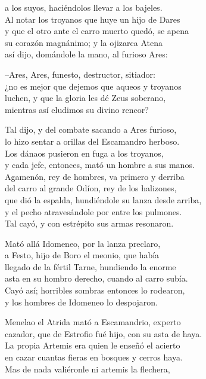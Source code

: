 a los suyos, haciéndolos llevar a los bajeles.\\
Al notar los troyanos que huye un hijo de Dares\\
y que el otro ante el carro muerto quedó, se apena\\
su corazón magnánimo; y la ojizarca Atena\\
así dijo, domándole la mano, al furioso Ares:\par
--Ares, Ares, funesto, destructor, sitiador:\\
¿no es mejor que dejemos que aqueos y troyanos\\
luchen, y que la gloria les dé Zeus soberano,\\
mientras así eludimos su divino rencor?\par
Tal dijo, y del combate sacando a Ares furioso,\\
lo hizo sentar a orillas del Escamandro herboso.\\
Los dánaos pusieron en fuga a los troyanos,\\
y cada jefe, entonces, mató un hombre a sus manos.\\
Agamenón, rey de hombres, va primero y derriba\\
del carro al grande Odíon, rey de los halizones,\\
que dió la espalda, hundiéndole su lanza desde arriba,\\
y el pecho atravesándole por entre los pulmones.\\
Tal cayó, y con estrépito sus armas resonaron.\par
Mató allá Idomeneo, por la lanza preclaro,\\
a Festo, hijo de Boro el meonio, que había\\
llegado de la fértil Tarne, hundiendo la enorme\\
asta en su hombro derecho, cuando al carro subía.\\
Cayó así; horribles sombras entonces lo rodearon,\\
y los hombres de Idomeneo lo despojaron.\par
Menelao el Atrida mató a Escamandrio, experto\\
cazador, que de Estrofio fué hijo, con su asta de haya.\\
La propia Artemis era quien le enseñó el acierto\\
en cazar cuantas fieras en bosques y cerros haya.\\
Mas de nada valiéronle ni artemis la flechera,\\
